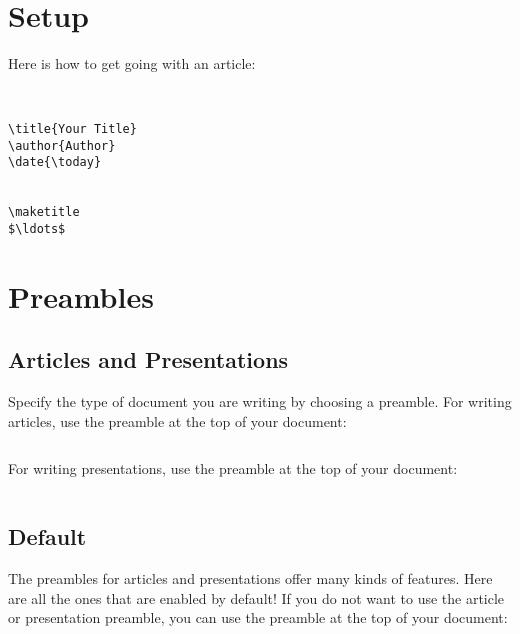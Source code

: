 \section{Setup}
Here is how to get going with an article:
\begin{lstlisting}[language=MyTeX]


\title{Your Title}
\author{Author}
\date{\today}


\maketitle
$\ldots$
\end{lstlisting}

\section{Preambles}
\subsection{Articles and Presentations}
Specify the type of document you are writing by choosing a preamble. For writing articles, use the  preamble at the top of your document:
\begin{lstlisting}[language=MyTex]
 \end{lstlisting}
For writing presentations, use the  preamble at the top of your document:
\begin{lstlisting}[language=MyTex]
 \end{lstlisting} 

\subsection{Default}
The preambles for articles and presentations offer many kinds of features. Here are all the ones that are enabled by default! If you do not want to use the article or presentation preamble, you can use the  preamble at the top of your document:
\begin{lstlisting}[language=MyTex]
 \end{lstlisting}



